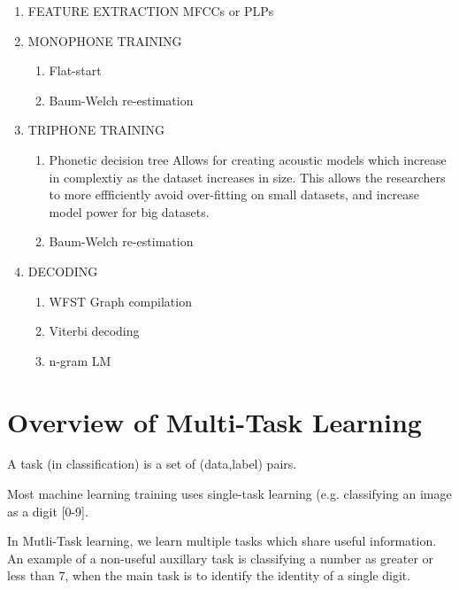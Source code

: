 \documentclass[10pt,a4paper]{article}
\begin{document}
\begin{enumerate}

\item FEATURE EXTRACTION
  MFCCs or PLPs

\item MONOPHONE TRAINING
  \begin{enumerate}
  \item Flat-start
  \item Baum-Welch re-estimation
  \end{enumerate}
  
\item TRIPHONE TRAINING
    \begin{enumerate}
    \item Phonetic decision tree
      Allows for creating acoustic models which increase in complextiy as the dataset increases in size. This allows the researchers to more effficiently avoid over-fitting on small datasets, and increase model power for big datasets.
    \item Baum-Welch re-estimation
    \end{enumerate}

\item DECODING
  \begin{enumerate}
  \item WFST Graph compilation
  \item Viterbi decoding
  \item n-gram LM
  \end{enumerate}
  
\end{enumerate}









\newpage

\section{Overview of Multi-Task Learning}

A task (in classification) is a set of (data,label) pairs.

Most machine learning training uses single-task learning (e.g. classifying an image as a digit [0-9].

In Mutli-Task learning, we learn multiple tasks which share useful information. An example of a non-useful auxillary task is classifying a number as greater or less than 7, when the main task is to identify the identity of a single digit.
\end{document}
